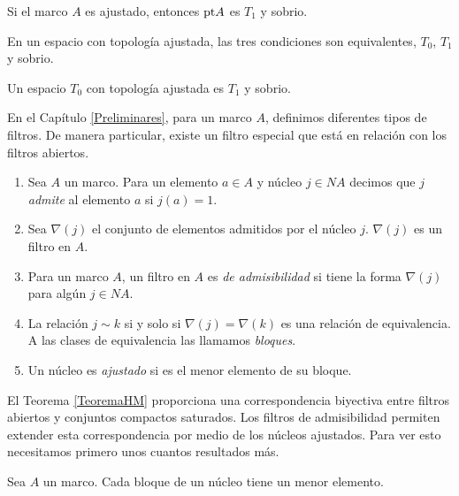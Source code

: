 \begin{lem}
    Si el marco $A$ es ajustado, entonces $\mathrm{pt} A$ es $T_1$ y sobrio.
\end{lem}

\begin{lem}
    En un espacio con topología ajustada, las tres condiciones son equivalentes, $T_0$, $T_1$ y sobrio.
\end{lem}

\begin{cor}
    Un espacio $T_0$ con topología ajustada es $T_1$ y sobrio.
\end{cor}

En el Capítulo \ref{Preliminares}, para un marco $A$, definimos diferentes tipos de filtros. De manera particular, existe un filtro especial que está en relación con los filtros abiertos. 

\begin{dfn}\label{Filtroadmisible}
    \begin{enumerate}
        \item Sea $A$ un marco. Para un elemento $a\in A$ y núcleo $j\in NA$ decimos que $j$ \emph{admite} al elemento $a$ si $j(a)=1$.

        \item Sea $\nabla (j)$ el conjunto de elementos admitidos por el núcleo $j$. $\nabla(j)$ es un filtro en $A$.

        \item Para un marco $A$, un filtro en $A$ es \emph{de admisibilidad} si tiene la forma $\nabla(j)$ para algún $j\in NA$.

        \item La relación $j\sim k$ si y solo si $\nabla(j)=\nabla(k)$ es una relación de equivalencia. A las clases de equivalencia las llamamos \emph{bloques}.

        \item Un núcleo es \emph{ajustado} si es el menor elemento de su bloque.
    \end{enumerate}
\end{dfn}

El Teorema \ref{TeoremaHM} proporciona una correspondencia 
biyectiva entre filtros abiertos y conjuntos compactos saturados. 
Los filtros de admisibilidad permiten extender esta correspondencia por medio de los núcleos ajustados. 
Para ver esto necesitamos primero unos cuantos resultados más.

\begin{lem}\label{Menorelemento}
    Sea $A$ un marco. Cada bloque de un núcleo tiene un menor elemento.
\end{lem}

